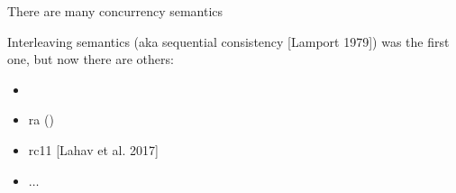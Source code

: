 \begin{frame}{There are many concurrency semantics}
  
  \pause

  Interleaving semantics (aka sequential consistency [Lamport 1979]) was the first one, but now there are others:
  \pause

  \begin{itemize}
  \item {}
  \item ra ()
  \item rc11 [Lahav et al. 2017]
  \item $\ldots$
  \end{itemize}
  
\end{frame}

